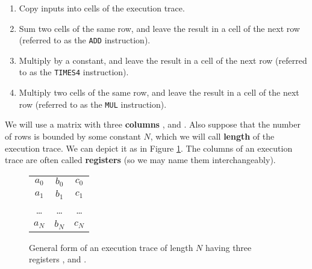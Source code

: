 \begin{enumerate}

\item Copy inputs into cells of the execution trace.

\item Sum two cells of the same row, and leave the result in a cell of the next row (referred to as the \texttt{ADD} instruction).

\item Multiply by a constant, and leave the result in a cell of the next row (referred to as the \texttt{TIMES4} instruction).

\item Multiply two cells of the same row, and leave the result in a cell of the next row (referred to as the \texttt{MUL} instruction).

\end{enumerate}

We will use a matrix with three \textbf{columns} \A, \B and \C. Also suppose that the number of rows is bounded by some constant $N$, which we will call \textbf{length} of the execution trace. We can depict it as in Figure \ref{fig:general-execution-trace}. The columns of an execution trace are often called \textbf{registers} (so we may name them interchangeably).

\begin{figure}[H]
\centering
\begin{tabular}{|c|c|c|}
\hline
\A & \B & \C \\ \hline
$a_0$ & $b_0$ & $c_0$   \\ \hline
$a_1$ & $b_1$ & $c_1$   \\ \hline
\dots & \dots & \dots   \\ \hline
$a_N$ & $b_N$ & $c_N$   \\ \hline
\end{tabular}
\caption{General form of an execution trace of length $N$ having three registers \A, \B and \C.}
\label{fig:general-execution-trace}
\end{figure}


